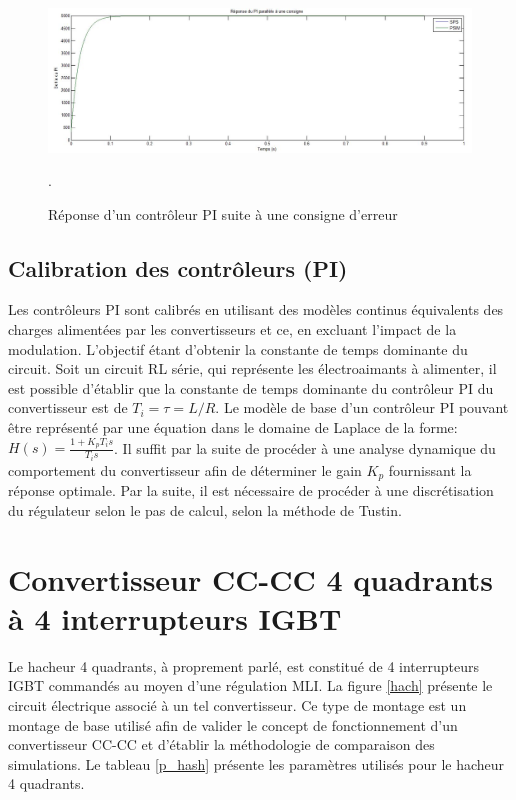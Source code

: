 \begin{figure}[htb]
\centering
\includegraphics[scale=0.5]{fig/Comp/PI.jpg}
\caption{Réponse d'un contrôleur PI suite à une consigne d'erreur}.
\label{PI}
\end{figure}

\clearpage
\subsection{Calibration des contrôleurs (PI)}
Les contrôleurs PI sont calibrés en utilisant des modèles continus équivalents des charges alimentées par les convertisseurs et ce, en excluant l'impact de la modulation. L'objectif étant d'obtenir la constante de temps dominante du circuit. Soit un circuit RL série, qui représente les électroaimants à alimenter, il est possible d'établir que la constante de temps dominante du contrôleur PI du convertisseur est de $T_i = \tau = L/R$. Le modèle de base d'un contrôleur PI pouvant être représenté par une équation dans le domaine de Laplace de la forme: $H(s) = \frac{1 + K_p T_is}{T_i s}$. Il suffit par la suite de procéder à une analyse dynamique du comportement du convertisseur afin de déterminer le gain $K_p$ fournissant la réponse optimale. Par la suite, il est nécessaire de procéder à une discrétisation du régulateur selon le pas de calcul, selon la méthode de Tustin. 
\section{Convertisseur CC-CC 4 quadrants à 4 interrupteurs IGBT}
Le hacheur 4 quadrants, à proprement parlé, est constitué de 4 interrupteurs IGBT commandés au moyen d'une régulation MLI. La figure \ref{hach} présente le circuit électrique associé à un tel convertisseur. Ce type de montage est un montage de base utilisé afin de valider le concept de fonctionnement d'un convertisseur CC-CC et d'établir la méthodologie de comparaison des simulations. Le tableau \ref{p_hash} présente les paramètres utilisés pour le hacheur 4 quadrants.

